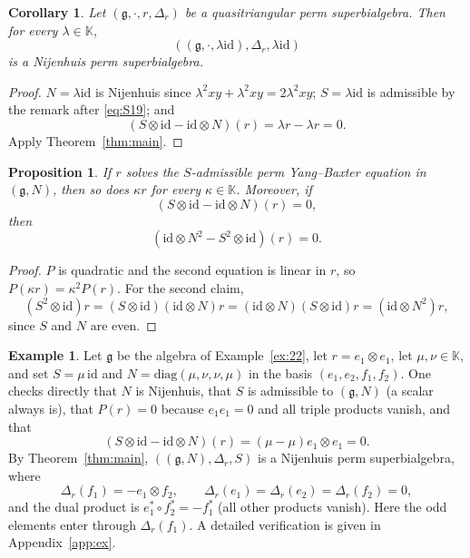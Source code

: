 \documentclass[11pt]{article}
\newtheorem{proposition}[theorem]{Proposition}
\newtheorem{corollary}[theorem]{Corollary}
\theoremstyle{definition}
\newtheorem{example}[theorem]{Example}
\newcommand{\g}{\mathfrak{g}}
\newcommand{\K}{\mathbb{K}}
\newcommand{\id}{\mathrm{id}}
\begin{document}
\begin{corollary}\label{cor:scalar}
Let $(\g,\cdot,r,\Delta_r)$ be a quasitriangular perm superbialgebra. Then for every $\lambda\in\K$,
\[
((\g,\cdot,\lambda\id),\Delta_r,\lambda\id)
\]
is a Nijenhuis perm superbialgebra.
\end{corollary}
\begin{proof}
$N=\lambda\id$ is Nijenhuis since $\lambda^2xy+\lambda^2xy=2\lambda^2xy$; $S=\lambda\id$ is admissible by the remark after \eqref{eq:S19}; and
\[
(S\otimes\id-\id\otimes N)(r)=\lambda r-\lambda r=0.
\]
Apply Theorem~\ref{thm:main}.
\end{proof}

\begin{proposition}\label{prop:scaling}
If $r$ solves the $S$-admissible perm Yang--Baxter equation in $(\g,N)$, then so does $\kappa r$ for every $\kappa\in\K$. Moreover, if
\[
(S\otimes\id-\id\otimes N)(r)=0,
\]
then
\[
(\id\otimes N^2-S^2\otimes\id)(r)=0.
\]
\end{proposition}
\begin{proof}
$P$ is quadratic and the second equation is linear in $r$, so $P(\kappa r)=\kappa^2P(r)$. For the second claim,
\[
(S^2\otimes\id)r=(S\otimes\id)(\id\otimes N)r
=(\id\otimes N)(S\otimes\id)r=(\id\otimes N^2)r,
\]
since $S$ and $N$ are even.
\end{proof}

\begin{example}\label{ex:Nbialg22}
Let $\g$ be the algebra of Example~\ref{ex:22}, let $r=e_1\otimes e_1$, let $\mu,\nu\in\K$, and set $S=\mu\,\id$ and $N=\mathrm{diag}(\mu,\nu,\nu,\mu)$ in the basis $(e_1,e_2,f_1,f_2)$. One checks directly that $N$ is Nijenhuis, that $S$ is admissible to $(\g,N)$ (a scalar always is), that $P(r)=0$ because $e_1e_1=0$ and all triple products vanish, and that
\[
(S\otimes\id-\id\otimes N)(r)=(\mu-\mu)e_1\otimes e_1=0.
\]
By Theorem~\ref{thm:main}, $((\g,N),\Delta_r,S)$ is a Nijenhuis perm superbialgebra, where
\[
\Delta_r(f_1)=-e_1\otimes f_2,
\qquad
\Delta_r(e_1)=\Delta_r(e_2)=\Delta_r(f_2)=0,
\]
and the dual product is $e_1^*\circ f_2^*=-f_1^*$ (all other products vanish). Here the odd elements enter through $\Delta_r(f_1)$. A detailed verification is given in Appendix~\ref{app:ex}.
\end{example}
\end{document}
